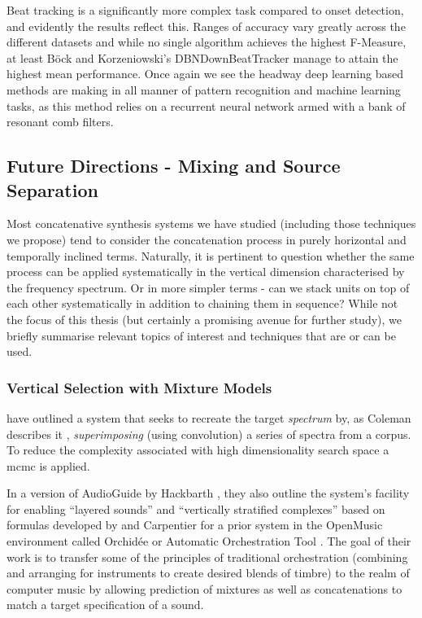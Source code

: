 {{Beat tracking is a significantly more complex task compared to onset detection, and evidently the results reflect this. Ranges of accuracy vary greatly across the different datasets and while no single algorithm achieves the highest F-Measure, at least Böck and Korzeniowski’s DBNDownBeatTracker manage to attain the highest mean performance. Once again we see the headway deep learning based methods are making in all manner of pattern recognition and machine learning tasks, as this method relies on a recurrent neural network armed with a bank of resonant comb filters. 

\subsection{Future Directions - Mixing and Source Separation}

Most concatenative synthesis systems we have studied (including those techniques we propose) tend to consider the concatenation process in purely horizontal and temporally inclined terms.  Naturally, it is pertinent to question whether the same process can be applied systematically in the vertical dimension characterised by the frequency spectrum. Or in more simpler terms - can we stack units on top of each other systematically in addition to chaining them in sequence? While not the focus of this thesis (but certainly a promising avenue for further study), we briefly summarise relevant topics of interest and  techniques that are or can be used.

\subsubsection{Vertical Selection with Mixture Models}

\cite{Hoffman2009} have outlined a system that seeks to recreate the target \textit{spectrum} by, as Coleman describes it \citeyearpar{Coleman2010}, \textit{superimposing} (using convolution) a series of spectra from a corpus. To reduce the complexity associated with high dimensionality search space a \acrfull{mcmc} is applied. 

In a version of AudioGuide by Hackbarth \citep{Hackbarth2013}, they also outline the system's facility for enabling ``layered sounds'' and ``vertically stratified complexes'' based on formulas developed by \cite{Tardieu2008} and Carpentier for a prior system in the OpenMusic environment called Orchidée or Automatic Orchestration Tool \cite{Carpentier2010}. The goal of their work is to transfer some of the principles of traditional orchestration (combining and arranging for instruments to create desired blends of timbre) to the realm of computer music by allowing prediction of mixtures as well as concatenations to match a target specification of a sound.

}}
